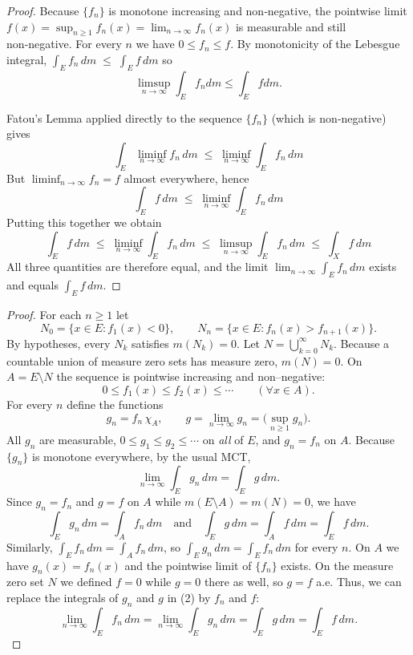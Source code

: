 \documentclass[11pt]{article}
\begin{document}
\begin{exercise}{3}
    \begin{proof} Because \(\{f_n\}\) is monotone increasing
and non‑negative, the pointwise limit  
\(
  f(x)=\sup_{n\ge1}f_n(x)=\lim_{n\to\infty}f_n(x)
\)
is measurable and still non‑negative. For every \(n\) we have \(0\le f_n\le f\).
By monotonicity of the Lebesgue integral,
\(
  \int_E f_n\,d m \;\le\;\int_E f\,d m 
\)
so
\[
  \displaystyle \limsup_{n\to\infty}\int_E f_n d m
  \le \int_E f d m.
\]

Fatou’s Lemma applied directly to the sequence \(\{f_n\}\) (which is non‑negative) gives
\[
  \int_E \liminf_{n\to\infty}f_n\,d m
  \;\le\;
  \liminf_{n\to\infty}\int_E f_n\,d m
\]
But \(\liminf_{n\to\infty} f_n = f\) almost everywhere, hence
\[
  \int_E f\,d m
  \;\le\;
  \liminf_{n\to\infty}\int_E f_n\,dm 
\]
Putting this together we obtain
\[
  \int_E f\,d m
  \;\le\;
  \liminf_{n\to\infty}\int_E f_n\,d m
  \;\le\;
  \limsup_{n\to\infty}\int_E f_n\,d m
  \;\le\;
  \int_X f\, dm
\]
All three quantities are therefore equal, and the limit
\(\displaystyle\lim_{n\to\infty}\int_E f_n\,d m\) exists and equals \(\int_E f\,d m\).
\end{proof}
\end{exercise}

\begin{exercise}{4}
    \begin{proof} For each \(n\ge1\) let  
\[
  N_{0} =\{x\in E : f_{1}(x)<0\},\qquad
  N_{n} =\{x\in E : f_{n}(x)>f_{n+1}(x)\}.
\]
By hypotheses, every \(N_{k}\) satisfies \(m(N_{k})=0\).
Let \(N =\bigcup_{k=0}^{\infty}N_{k}\).  
Because a countable union of measure zero sets has measure zero, \(m(N)=0\). On \(A = E \setminus N\) the sequence is pointwise increasing and non–negative:
\[
  0\le f_{1}(x)\le f_{2}(x)\le\cdots
  \qquad(\forall x\in A).
\]
For every \(n\) define the functions  
\[
  g_{n} =f_{n}\,\chi_{A},\qquad 
  g =\lim_{n\to\infty}g_{n}=\bigl(\sup_{n\ge1}g_{n}\bigr).
\]
All \(g_{n}\) are measurable, \(0\le g_{1}\le g_{2}\le\cdots\) on \emph{all}
of \(E\), and \(g_{n}=f_{n}\) on $A$.  
Because \(\{g_{n}\}\) is monotone everywhere, by the usual MCT,  
\[
  \lim_{n\to\infty}\int_{E}g_{n}\,dm
  =\int_{E}g\,dm.
\tag{2}
\]
Since \(g_{n}=f_{n}\) and \(g=f\) on \(A\) while
\(m(E\setminus A)=m(N)=0\), we have
\[
  \int_{E}g_{n}\,dm
  =\int_{A}f_{n}\,dm\quad\text{and}\quad
  \int_{E}g\,dm
  =\int_{A}f\,dm
  =\int_{E}f\,dm.
\]
Similarly, \(\int_{E}f_{n}\,dm=\int_{A}f_{n}\,dm\), so
\(
  \int_{E}g_{n}\,dm=\int_{E}f_{n}\,dm
\)
for every \(n\).
On \(A\) we have \(g_{n}(x)=f_{n}(x)\) and the pointwise limit of
\(\{f_{n}\}\) exists. On the measure zero set \(N\) we defined \(f= 0 \) while
\(g=0\) there as well, so \(g=f\) a.e.
Thus, we can replace the integrals of \(g_{n}\) and \(g\) in
(2) by  \(f_{n}\) and \(f\):
\[
  \lim_{n\to\infty}\int_{E}f_{n}\,dm
  =\lim_{n\to\infty}\int_{E}g_{n}\,dm
  =\int_{E}g\,dm
  =\int_{E}f\,dm.
\]
\end{proof}
\end{exercise}
\end{document}
